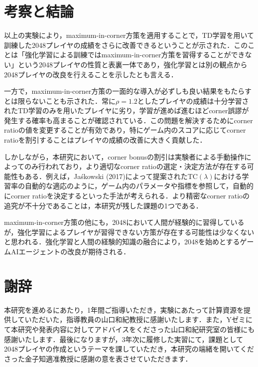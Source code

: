 \documentclass{suribt}
\begin{document}
\chapter{考察と結論}
以上の実験により，maximum-in-corner方策を適用することで，TD学習を用いて訓練した2048プレイヤの成績をさらに改善できるということが示された．このことは「強化学習による訓練ではmaximum-in-corner方策を習得することができない」という2048プレイヤの性質と表裏一体であり，強化学習とは別の観点から2048プレイヤの改良を行えることを示したとも言える．

一方で，maximum-in-corner方策の一面的な導入が必ずしも良い結果をもたらすとは限らないことも示された．常に${\rho}=1.2$としたプレイヤの成績は十分学習されたTD学習のみを用いたプレイヤに劣り，学習が進めば進むほどcorner誤謬が発生する確率も高まることが確認されている．この問題を解決するためにcorner ratioの値を変更することが有効であり，特にゲーム内のスコアに応じてcorner ratioを割引することはプレイヤの成績の改善に大きく貢献した．

しかしながら，本研究において，corner bonusの割引は実験者による手動操作によってのみ行われており，より適切なcorner ratioの選定・決定方法が存在する可能性もある．例えば，Ja\'{s}kowski (2017)によって提案されたTC$({\lambda})$における学習率の自動的な適応のように，ゲーム内のパラメータや指標を参照して，自動的にcorner ratioを決定するといった手法が考えられる．より精密なcorner ratioの追究が不十分であることは，本研究が残した課題の1つである．

maximum-in-corner方策の他にも，2048において人間が経験的に習得しているが，強化学習によるプレイヤが習得できない方策が存在する可能性は少なくないと思われる．強化学習と人間の経験的知識の融合により，2048を始めとするゲームAIエージェントの改良が期待される．

\backmatter
\chapter{謝辞}
本研究を進めるにあたり，1年間ご指導いただき，実験にあたって計算資源を提供していただいた，指導教員の山口和紀教授に感謝いたします．また，Yゼミにて本研究や発表内容に対してアドバイスをくださった山口和紀研究室の皆様にも感謝いたします．最後になりますが，3年次に履修した実習にて，課題として2048プレイヤの作成というテーマを課していただき，本研究の端緒を開いてくださった金子知適准教授に感謝の意を表させていただきます．
\end{document}
